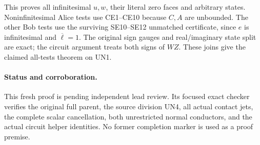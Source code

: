 This proves all infinitesimal $u,w$, their literal zero faces and
arbitrary states. Noninfinitesimal Alice tests use CE1--CE10 because
$C,A$ are unbounded. The other Bob tests use the surviving SE10--SE12
unmatched certificate, since $e$ is infinitesimal and
$\overline\ell=1$. The original sign gauges and real/imaginary state
split are exact; the circuit argument treats both signs of $WZ$.
These joins give the claimed all-tests theorem on UN1.

\paragraph{Status and corroboration.}
This fresh proof is pending independent lead review. Its focused
exact checker verifies the original full parent, the source division
UN4, all actual contact jets, the complete scalar cancellation,
both unrestricted normal conductors, and the actual circuit helper
identities. No former completion marker is used as a proof premise.
